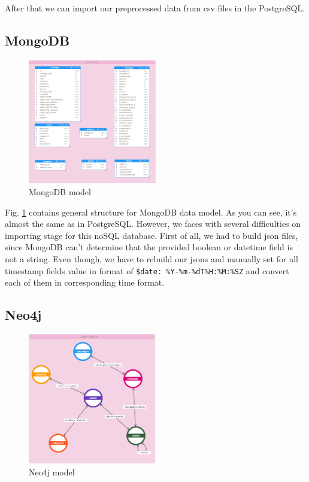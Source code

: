 \documentclass[conference]{IEEEtran}
\newcommand{\code}[1]{\colorbox{codegray}{\texttt{#1}}}
\begin{document}
After that we can import our preprocessed data from csv files in the PostgreSQL.

\subsection{MongoDB}

\begin{figure}
  \centering
    \includegraphics[width=0.5\textwidth]{./pictures/MongoDB.png}
    \caption[MongoDB model]{MongoDB model}\label{fig:mongo}
\end{figure}

 Fig. \ref{fig:mongo} contains general structure for MongoDB data model. As you can see, it's almost the same as in PostgreSQL. However, we faces with several difficulties on importing stage for this noSQL database. First of all, we had to build json files, since MongoDB can't determine that the provided boolean or datetime field is not a string. Even though, we have to rebuild our jsons and manually set for all timestamp fields value in format of \code{\$date: \%Y-\%m-\%dT\%H:\%M:\%SZ} and convert each of them in corresponding time format.

 \subsection{Neo4j}

\begin{figure}
  \centering
    \includegraphics[width=0.5\textwidth]{./pictures/Neo4j.png}
    \caption[Neo4j model]{Neo4j model}\label{fig:neo}
\end{figure}
\end{document}
